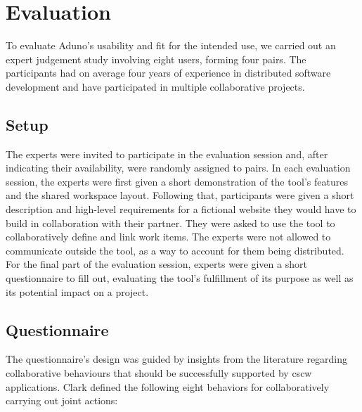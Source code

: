 \documentclass[conference]{IEEEtran}
\begin{document}
\section{Evaluation}
\label{sec:evaluation}

To evaluate Aduno's usability and fit for the intended use, we carried out an expert judgement study involving eight users, forming four pairs. The participants had on average four years of experience in distributed software development and have participated in multiple collaborative projects.


\subsection{Setup}
The experts were invited to participate in the evaluation session and, after indicating their availability, were randomly assigned to pairs. In each evaluation session, the experts were first given a short demonstration of the tool's features and the shared workspace layout. Following that, participants were given a short description and high-level requirements for a fictional website they would have to build in collaboration with their partner. They were asked to use the tool to collaboratively define and link work items. The experts were not allowed to communicate outside the tool, as a way to account for them being distributed. For the final part of the evaluation session, experts were given a short questionnaire to fill out, evaluating the tool's fulfillment of its purpose as well as its potential impact on a project.

\subsection{Questionnaire}
The questionnaire's design was guided by insights from the literature regarding collaborative behaviours that should be successfully supported by {\sc cscw} applications. Clark \cite{Clark96} defined the following eight behaviors for collaboratively carrying out joint actions:
\end{document}
